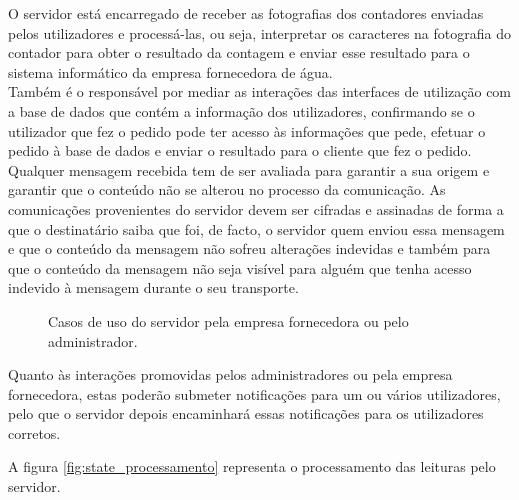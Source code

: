 O servidor está encarregado de receber as fotografias dos contadores enviadas pelos utilizadores e processá-las, ou seja, interpretar os caracteres na fotografia do contador para obter o resultado da contagem e enviar esse resultado para o sistema informático da empresa fornecedora de água.\\
Também é o responsável por mediar as interações das interfaces de utilização com a base de dados que contém a informação dos utilizadores, confirmando se o utilizador que fez o pedido pode ter acesso às informações que pede, efetuar o pedido à base de dados e enviar o resultado para o cliente que fez o pedido.\\
Qualquer mensagem recebida tem de ser avaliada para garantir a sua origem e garantir que o conteúdo não se alterou no processo da comunicação. As comunicações provenientes do servidor devem ser cifradas e assinadas de forma a que o destinatário saiba que foi, de facto, o servidor quem enviou essa mensagem e que o conteúdo da mensagem não sofreu alterações indevidas e também para que o conteúdo da mensagem não seja visível para alguém que tenha acesso indevido à mensagem durante o seu transporte.\\

\vspace{2.5cm} %

\begin{figure}[h!]
\begin{center}
\caption{Casos de uso do servidor pela empresa fornecedora ou pelo administrador.}
\label{fig:uso_serv2}
\end{center}
\end{figure}

Quanto às interações promovidas pelos administradores ou pela empresa fornecedora, estas poderão submeter notificações para um ou vários utilizadores, pelo que o servidor depois encaminhará essas notificações para os utilizadores corretos.

A figura \ref{fig:state_processamento} representa o processamento das leituras pelo servidor.

